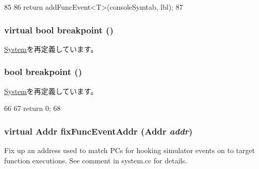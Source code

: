 \begin{DoxyCode}
85     {
86         return addFuncEvent<T>(consoleSymtab, lbl);
87     }
\end{DoxyCode}
\hypertarget{classMipsSystem_aa9fdfc3926a9047bc0fb3d7b13030064}{
\subsubsection[{breakpoint}]{\setlength{\rightskip}{0pt plus 5cm}virtual bool breakpoint ()}}
\label{classMipsSystem_aa9fdfc3926a9047bc0fb3d7b13030064}


\hyperlink{classSystem_ae59ed2201db88c0668ca26040f6a3ad0}{System}を再定義しています。\hypertarget{classMipsSystem_ae59ed2201db88c0668ca26040f6a3ad0}{
\subsubsection[{breakpoint}]{\setlength{\rightskip}{0pt plus 5cm}bool breakpoint ()}}
\label{classMipsSystem_ae59ed2201db88c0668ca26040f6a3ad0}


\hyperlink{classSystem_ae59ed2201db88c0668ca26040f6a3ad0}{System}を再定義しています。


\begin{DoxyCode}
66 {
67     return 0;
68 }
\end{DoxyCode}
\hypertarget{classMipsSystem_aff94f650c5eef23b8dc350ea755bdef4}{
\subsubsection[{fixFuncEventAddr}]{\setlength{\rightskip}{0pt plus 5cm}virtual {\bf Addr} fixFuncEventAddr ({\bf Addr} {\em addr})}}
\label{classMipsSystem_aff94f650c5eef23b8dc350ea755bdef4}
Fix up an address used to match PCs for hooking simulator events on to target function executions. See comment in system.cc for details. 

